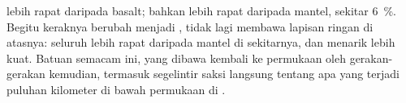  lebih rapat daripada basalt;  bahkan lebih rapat daripada
 mantel, sekitar \qty{6}{\percent}. Begitu keraknya berubah menjadi
,  tidak lagi membawa lapisan ringan di atasnya: seluruh
 lebih rapat daripada mantel di sekitarnya, dan menarik lebih kuat.
Batuan semacam ini, yang dibawa kembali ke permukaan oleh gerakan-gerakan
kemudian, termasuk segelintir saksi langsung tentang apa yang terjadi puluhan
kilometer di bawah permukaan di .


